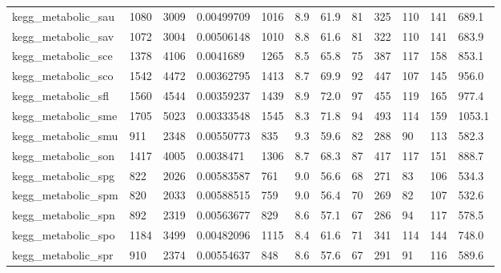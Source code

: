 \begin{longtable}{llllllllllll}
 kegg\_metabolic\_sau                                 & 1080       & 3009      & 0.00499709  & 1016  & 8.9    & 61.9   & 81    & 325    & 110    & 141    & 689.1   \\
 kegg\_metabolic\_sav                                 & 1072       & 3004      & 0.00506148  & 1010  & 8.8    & 61.6   & 81    & 322    & 110    & 141    & 683.9   \\
 kegg\_metabolic\_sce                                 & 1378       & 4106      & 0.0041689   & 1265  & 8.5    & 65.8   & 75    & 387    & 117    & 158    & 853.1   \\
 kegg\_metabolic\_sco                                 & 1542       & 4472      & 0.00362795  & 1413  & 8.7    & 69.9   & 92    & 447    & 107    & 145    & 956.0   \\
 kegg\_metabolic\_sfl                                 & 1560       & 4544      & 0.00359237  & 1439  & 8.9    & 72.0   & 97    & 455    & 119    & 165    & 977.4   \\
 kegg\_metabolic\_sme                                 & 1705       & 5023      & 0.00333548  & 1545  & 8.3    & 71.8   & 94    & 493    & 114    & 159    & 1053.1  \\
 kegg\_metabolic\_smu                                 & 911        & 2348      & 0.00550773  & 835   & 9.3    & 59.6   & 82    & 288    & 90     & 113    & 582.3   \\
 kegg\_metabolic\_son                                 & 1417       & 4005      & 0.0038471   & 1306  & 8.7    & 68.3   & 87    & 417    & 117    & 151    & 888.7   \\
 kegg\_metabolic\_spg                                 & 822        & 2026      & 0.00583587  & 761   & 9.0    & 56.6   & 68    & 271    & 83     & 106    & 534.3   \\
 kegg\_metabolic\_spm                                 & 820        & 2033      & 0.00588515  & 759   & 9.0    & 56.4   & 70    & 269    & 82     & 107    & 532.6   \\
 kegg\_metabolic\_spn                                 & 892        & 2319      & 0.00563677  & 829   & 8.6    & 57.1   & 67    & 286    & 94     & 117    & 578.5   \\
 kegg\_metabolic\_spo                                 & 1184       & 3499      & 0.00482096  & 1115  & 8.4    & 61.6   & 71    & 341    & 114    & 144    & 748.0   \\
 kegg\_metabolic\_spr                                 & 910        & 2374      & 0.00554637  & 848   & 8.6    & 57.6   & 67    & 291    & 91     & 116    & 589.6   \\

\end{longtable}
